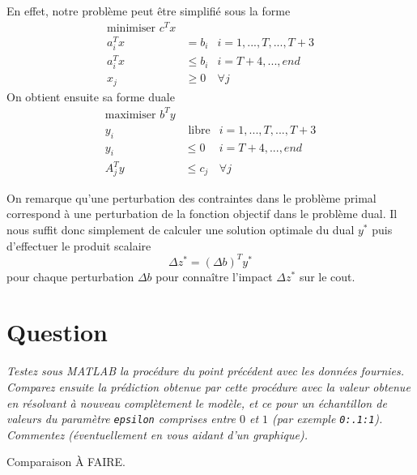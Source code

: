 \documentclass[12pt,oneside,a4paper]{article}
\newcommand{\question}
{
\addtocounter{section}{1}
\section*{Question \thesection}
}
\begin{document}
En effet, notre problème peut être simplifié sous la forme
\begin{align*} 
	\text{minimiser } c^T x \\
	a_i^T x &= b_i  & i = 1,...,T,...,T+3 \\
  a_i^T x &\leq b_i & i = T+4,...,end \\
	x_j &\geq 0 & \forall j
\end{align*}
On obtient ensuite sa forme duale
\begin{align*} 
	\text{maximiser } b^T y \\
	y_i &\text{ libre} & i = 1,...,T,...,T+3 \\
  y_i &\leq 0 & i = T+4,...,end \\
  A_j^T y &\leq c_j & \forall j
\end{align*}

On remarque qu'une perturbation des contraintes dans le problème primal
correspond à une perturbation de la fonction objectif dans le problème dual.
Il nous suffit donc simplement de calculer une solution optimale du dual $y^{*}$
puis d'effectuer le produit scalaire
\[ \Delta z^{*} = (\Delta b)^T y^{*} \]
pour chaque perturbation $\Delta b$ pour conna\^itre l'impact $\Delta z^{*}$
sur le cout.

\question %
\emph{Testez sous MATLAB la procédure du point précédent avec les données
fournies. Comparez ensuite la prédiction obtenue par cette procédure
avec la valeur obtenue en résolvant à nouveau complètement le modèle,
et ce pour un échantillon de valeurs du paramètre \texttt{epsilon} comprises
entre $0$ et $1$ (par exemple \texttt{0:.1:1}). 
Commentez (éventuellement en vous aidant d'un graphique).}

Comparaison À FAIRE.
\end{document}
